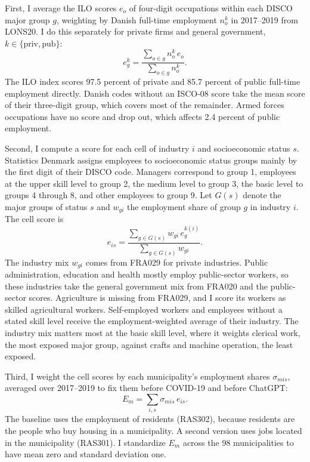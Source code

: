 \documentclass[12pt]{article}
\begin{document}
First, I average the ILO scores $e_o$ of four-digit occupations within each DISCO major group $g$, weighting by Danish full-time employment $n^k_o$ in 2017--2019 from LONS20. I do this separately for private firms and general government, $k \in \{\text{priv}, \text{pub}\}$:
\begin{equation}
e^k_g = \frac{\sum_{o \in g} n^k_o \, e_o}{\sum_{o \in g} n^k_o}.
\end{equation}
The ILO index scores 97.5 percent of private and 85.7 percent of public full-time employment directly. Danish codes without an ISCO-08 score take the mean score of their three-digit group, which covers most of the remainder. Armed forces occupations have no score and drop out, which affects 2.4 percent of public employment.

Second, I compute a score for each cell of industry $i$ and socioeconomic status $s$. Statistics Denmark assigns employees to socioeconomic status groups mainly by the first digit of their DISCO code. Managers correspond to group 1, employees at the upper skill level to group 2, the medium level to group 3, the basic level to groups 4 through 8, and other employees to group 9. Let $G(s)$ denote the major groups of status $s$ and $w_{gi}$ the employment share of group $g$ in industry $i$. The cell score is
\begin{equation}
e_{is} = \frac{\sum_{g \in G(s)} w_{gi} \, e^{k(i)}_g}{\sum_{g \in G(s)} w_{gi}}.
\end{equation}
The industry mix $w_{gi}$ comes from FRA029 for private industries. Public administration, education and health mostly employ public-sector workers, so these industries take the general government mix from FRA020 and the public-sector scores. Agriculture is missing from FRA029, and I score its workers as skilled agricultural workers. Self-employed workers and employees without a stated skill level receive the employment-weighted average of their industry. The industry mix matters most at the basic skill level, where it weights clerical work, the most exposed major group, against crafts and machine operation, the least exposed.

Third, I weight the cell scores by each municipality's employment shares $\sigma_{mis}$, averaged over 2017--2019 to fix them before COVID-19 and before ChatGPT:
\begin{equation}
E_m = \sum_{i,s} \sigma_{mis} \, e_{is}.
\end{equation}
The baseline uses the employment of residents (RAS302), because residents are the people who buy housing in a municipality. A second version uses jobs located in the municipality (RAS301). I standardize $E_m$ across the 98 municipalities to have mean zero and standard deviation one.
\end{document}
